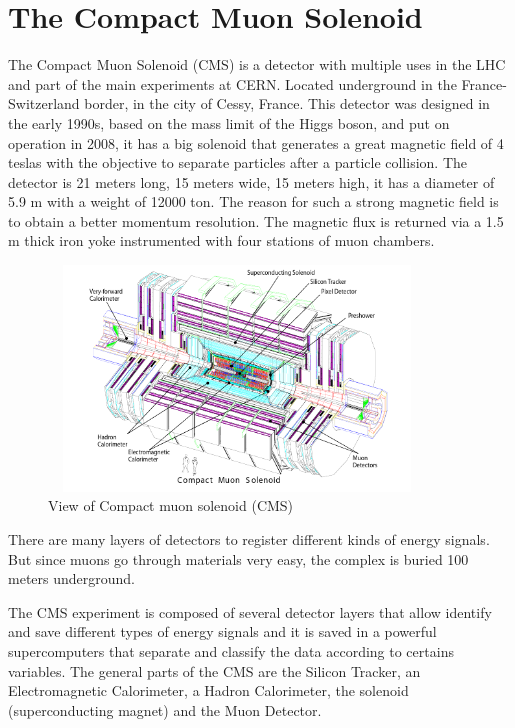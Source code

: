 \section{The Compact Muon Solenoid}	
The Compact Muon Solenoid (CMS) is a detector with multiple uses in the LHC and part of the main experiments at CERN. Located underground in the France- Switzerland border, in the city of Cessy, France.
This detector was designed in the early 1990s, based on the mass limit of the Higgs boson, and put on operation in 2008, it has a big solenoid that generates a great magnetic field of 4 teslas with the objective to separate particles after a particle collision.
 The detector is 21 meters long, 15 meters wide, 15 meters high, it has a diameter of 5.9 m with a weight of 12000 ton. The reason for such a strong magnetic field is to obtain a better momentum resolution.
 The magnetic flux is returned via a 1.5 m thick iron yoke instrumented with four stations of muon
 chambers.



\begin{figure}[ht]
	\centering
	\includegraphics[width=10cm,height=6cm]{Chapter2/cms2.png}
	\caption[View of Compact muon solenoid (CMS)]{View of Compact muon solenoid (CMS)\cite{cms-manual}}\label{cms}
\end{figure}
There are many layers of detectors to register different kinds of energy signals. But since muons go through materials very easy, the complex is buried 100 meters underground. 

The CMS experiment is composed of several detector layers that allow identify and save different types of energy signals and it is saved in a powerful supercomputers that separate and classify the data according to certains variables. The general parts of the CMS are the Silicon Tracker, an Electromagnetic Calorimeter, a Hadron Calorimeter, the solenoid (superconducting magnet) and the Muon Detector. 

